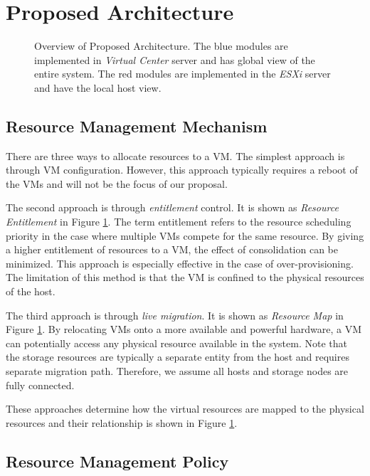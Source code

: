 \section{Proposed Architecture}
\label{sec:technical}
% 
\begin{figure}[t]
\centering

\caption{Overview of Proposed Architecture. The blue modules are implemented in \emph{Virtual Center} server and has global view of the entire system. The red modules are implemented in the \emph{ESXi} server and have the local host view.}
\label{arch}
\end{figure}

\subsection{Resource Management Mechanism}

There are three ways to allocate resources to a VM. 
The simplest approach is through VM configuration. 
However, this approach typically requires a reboot of the VMs and will not be the focus of our proposal. 

The second approach is through \emph{entitlement} control.
It is shown as \emph{Resource Entitlement} in Figure \ref{arch}.
The term entitlement refers to the resource scheduling priority in the case where multiple VMs compete for the same resource\cite{}.
By giving a higher entitlement of resources to a VM, the effect of consolidation can be minimized.
This approach is especially effective in the case of over-provisioning.
The limitation of this method is that the VM is confined to the physical resources of the host. 

The third approach is through \emph{live migration}. 
It is shown as \emph{Resource Map} in Figure \ref{arch}.
By relocating VMs onto a more available and powerful hardware, a VM can potentially access any physical resource available in the system. 
Note that the storage resources are typically a separate entity from the host and requires separate migration path. 
Therefore, we assume all hosts and storage nodes are fully connected. 

These approaches determine how the virtual resources are mapped to the physical resources and their relationship is shown in Figure \ref{arch}.

\subsection{Resource Management Policy}

